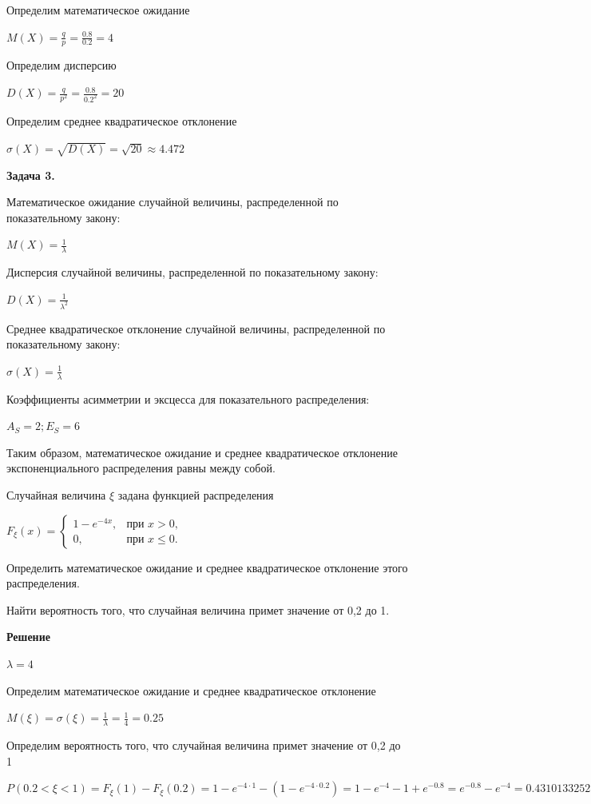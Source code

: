 Определим математическое ожидание

$M(X) = \frac{q}{p} = \frac{0.8}{0.2} = 4$

Определим дисперсию

$D(X) = \frac{q}{p^2} = \frac{0.8}{0.2^2} = 20$

Определим среднее квадратическое отклонение

$\sigma(X) = \sqrt{D(X)} = \sqrt{20} \approx 4.472$

\bigskip

\textbf{Задача 3.}

Математическое ожидание случайной величины, распределенной
по показательному закону:

$M(X) = \frac{1}{\lambda}$

Дисперсия случайной величины, распределенной по
показательному закону:

$D(X) = \frac{1}{\lambda^2}$

Среднее квадратическое отклонение случайной величины,
распределенной по показательному закону:

$\sigma(X) = \frac{1}{\lambda}$

Коэффициенты асимметрии и эксцесса для показательного
распределения:

$A_S = 2; E_S = 6$

Таким образом, математическое ожидание и среднее
квадратическое отклонение экспоненциального распределения равны
между собой.

Случайная величина $\xi$ задана функцией распределения

$F_\xi(x) =
\begin{cases} 
1 - e^{-4x}, & \text{при } x > 0, \\
0, & \text{при } x \leq 0.
\end{cases}$

Определить математическое ожидание и среднее квадратическое
отклонение этого распределения.

Найти вероятность того, что случайная величина примет значение
от 0,2 до 1.

\textbf{Решение}

$\lambda = 4$

Определим математическое ожидание и среднее квадратическое отклонение

$M(\xi) = \sigma(\xi) = \frac{1}{\lambda} = \frac{1}{4} = 0.25$

Определим вероятность того, что случайная величина примет значение
от 0,2 до 1

$P(0.2 < \xi < 1) = F_{\xi}(1) - F_{\xi}(0.2) = 1 - e^{-4 \cdot 1} - (1 - e^{-4 \cdot 0.2}) = 1 - e^{-4} - 1 + e^{-0.8} = e^{-0.8} - e^{-4} = 0.4310133252284874 \approx 0.431$



